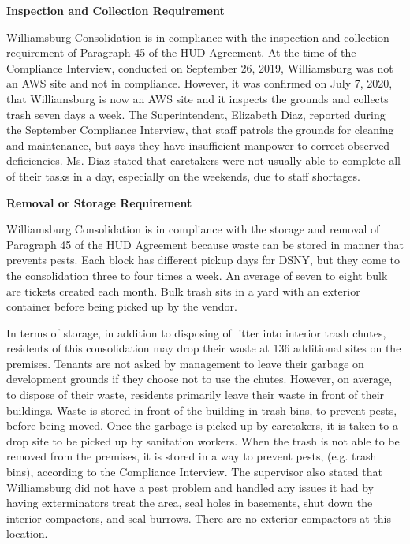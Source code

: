 
\textbf{Inspection and Collection Requirement}

Williamsburg Consolidation is in compliance with the inspection and collection requirement of Paragraph 45 of the HUD Agreement. At the time of the Compliance Interview, conducted on September 26, 2019, Williamsburg was not an AWS site and not in compliance. However, it was confirmed on July 7, 2020, that Williamsburg is now an AWS site and it inspects the grounds and collects trash seven days a week. The Superintendent, Elizabeth Diaz, reported during the September Compliance Interview, that staff patrols the grounds for cleaning and maintenance, but says they have insufficient manpower to correct observed deficiencies. Ms. Diaz stated that caretakers were not usually able to complete all of their tasks in a day, especially on the weekends, due to staff shortages.

\textbf{Removal or Storage Requirement}

Williamsburg Consolidation is in compliance with the storage and removal of Paragraph 45 of the HUD Agreement because waste can be stored in manner that prevents pests. Each block has different pickup days for DSNY, but they come to the consolidation three to four times a week. An average of seven to eight bulk are tickets created each month.  Bulk trash sits in a yard with an exterior container before being picked up by the vendor. 

In terms of storage, in addition to disposing of litter into interior trash chutes, residents of this consolidation may drop their waste at 136 additional sites on the premises. Tenants are not asked by management to leave their garbage on development grounds if they choose not to use the chutes. However, on average, to dispose of  their waste, residents primarily leave their waste in front of their buildings. Waste is stored in front of the building in trash bins, to prevent pests, before being moved. Once the garbage is picked up by caretakers, it is taken to a drop site to be picked up by sanitation workers. When the trash is not able to be removed from the premises, it is stored in a way to prevent pests, (e.g. trash bins), according to the Compliance Interview. The supervisor also stated that Williamsburg did not have a pest problem and handled any issues it had by having exterminators treat the area, seal holes in basements, shut down the interior compactors, and seal burrows. There are no exterior compactors at this location.

